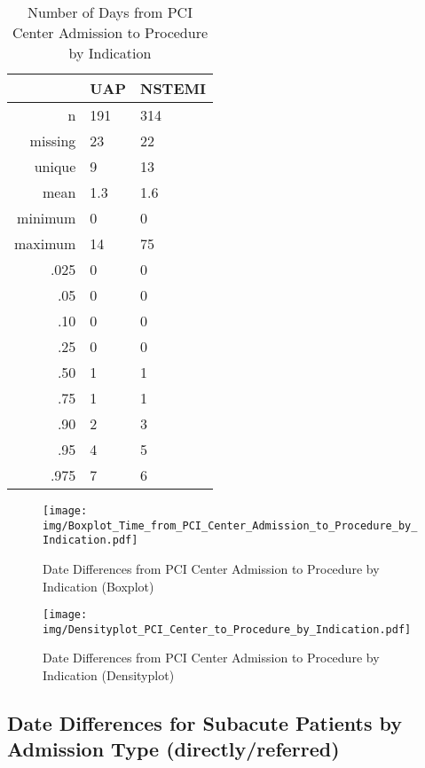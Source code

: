 \documentclass[presentation,xcolor=pdftex,dvipsnames,table,11pt]{beamer}
\begin{document}
\begin{tiny}
\begin{table}[ht]
\centering
\begin{tabular}{rll}
  \toprule
 & UAP & NSTEMI \\ 
  \midrule
n & 191 & 314 \\ 
  missing & 23 & 22 \\ 
  unique & 9 & 13 \\ 
  mean & 1.3 & 1.6 \\ 
  minimum & 0 & 0 \\ 
  maximum & 14 & 75 \\ 
  .025 & 0 & 0 \\ 
  .05 & 0 & 0 \\ 
  .10 & 0 & 0 \\ 
  .25 & 0 & 0 \\ 
  .50 & 1 & 1 \\ 
  .75 & 1 & 1 \\ 
  .90 & 2 & 3 \\ 
  .95 & 4 & 5 \\ 
  .975 & 7 & 6 \\ 
   \bottomrule
\end{tabular}
\caption{Number of Days from PCI Center Admission to Procedure by Indication} 
\end{table}
\begin{frame}
\begin{figure}
  \centering
  \caption{Date Differences from PCI Center Admission to Procedure by Indication (Boxplot)}
  \label{Boxplot: Date Differences from PCI Center Admission to Procedure by Indication}
\texttt{[image: img/Boxplot\_Time\_from\_PCI\_Center\_Admission\_to\_Procedure\_by\_Indication.pdf]}\end{figure}
\end{frame}


\begin{frame}
\begin{figure}
  \centering
  \caption{Date Differences from PCI Center Admission to Procedure by Indication (Densityplot)}
  \label{Density: Date Differences from PCI Center Admission to Procedure by Indication}
\texttt{[image: img/Densityplot\_PCI\_Center\_to\_Procedure\_by\_Indication.pdf]}\end{figure}
\end{frame}





\subsection{Date Differences for Subacute Patients by Admission Type (directly/referred)}



\end{tiny}
\end{document}
